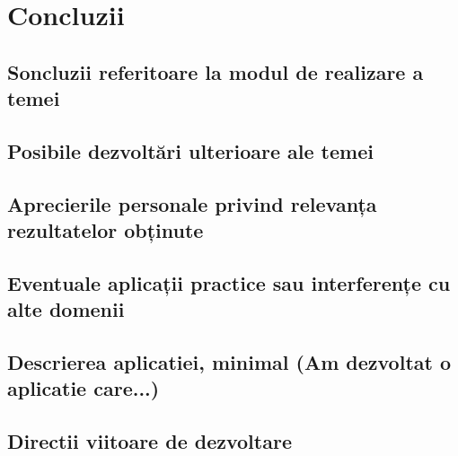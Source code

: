 \chapter{Concluzii}

\section{Soncluzii referitoare la modul de realizare a temei}
\section{Posibile dezvoltări ulterioare ale temei}
\section{Aprecierile personale privind relevanța rezultatelor obținute}
\section{Eventuale aplicații practice sau interferențe cu alte domenii}
\section{Descrierea aplicatiei, minimal (Am dezvoltat o aplicatie care...)}
\section{Directii viitoare de dezvoltare}
